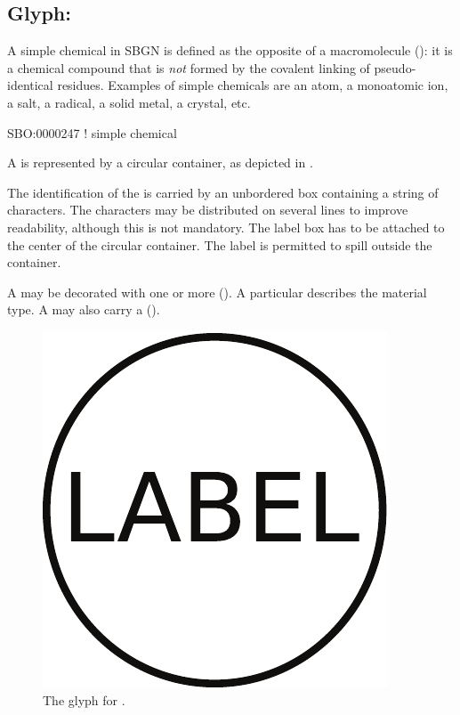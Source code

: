 
\subsection{Glyph: }
\label{sec:simpleChemical}

A simple chemical in SBGN is defined as the opposite of a macromolecule (): it is a chemical compound that is \emph{not} formed by the covalent linking of pseudo-identical residues.  Examples of simple chemicals are an atom, a monoatomic ion, a salt, a radical, a solid metal, a crystal, etc.

\begin{glyphDescription}

\glyphSboTerm SBO:0000247 ! simple chemical

\glyphContainer A  is represented by a circular container, as depicted in .

\glyphLabel The identification of the  is carried by an unbordered box containing a string of characters.  The characters may be distributed on several lines to improve readability, although this is not mandatory.  The label box has to be attached to the center of the circular container.  The label is permitted to spill outside the container.

\glyphAux A  may be decorated with one or more  ().  A particular  describes the material type.  A  may also carry a  ().

\end{glyphDescription}

\begin{figure}[H]
  \centering
  \includegraphics[scale = 0.3]{images/simpleChemical}
  \caption{The \PD glyph for .}
  \label{fig:simpleChemical}
\end{figure}



